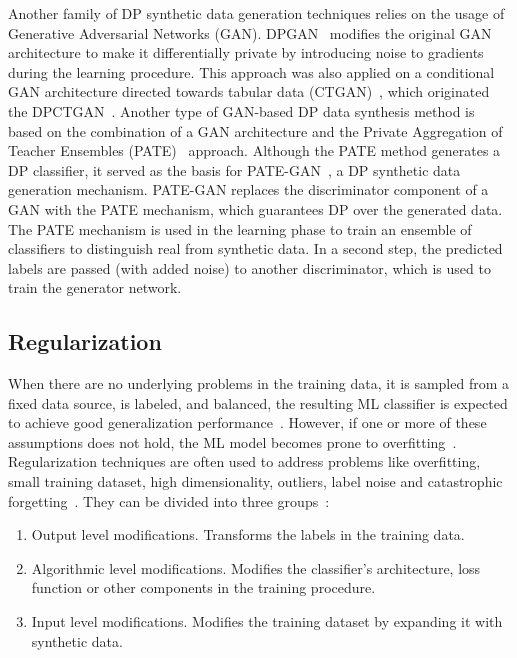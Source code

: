 \documentclass[parskip=full]{scrartcl}
\begin{document}
Another family of DP synthetic data generation techniques relies on the usage
of Generative Adversarial Networks (GAN). DPGAN~\cite{xie2018differentially}
modifies the original GAN architecture to make it differentially private by
introducing noise to gradients during the learning procedure. This approach
was also applied on a conditional GAN architecture directed towards tabular
data (CTGAN)~\cite{xu2019modeling}, which originated the
DPCTGAN~\cite{rosenblatt2020differentially}. Another type of GAN-based DP data
synthesis method is based on the combination of a GAN architecture and the
Private Aggregation of Teacher Ensembles (PATE)~\cite{papernot2017semi}
approach. Although the PATE method generates a DP classifier, it served as the
basis for PATE-GAN~\cite{jordon2018pate}, a DP synthetic data generation
mechanism. PATE-GAN replaces the discriminator component of a GAN with the
PATE mechanism, which guarantees DP over the generated data. The PATE
mechanism is used in the learning phase to train an ensemble of classifiers to
distinguish real from synthetic data. In a second step, the predicted labels
are passed (with added noise) to another discriminator, which is used to train
the generator network.

\subsection{Regularization}\label{sec:regularization}

When there are no underlying problems in the training data, it is sampled from
a fixed data source, is labeled, and balanced, the resulting ML classifier is
expected to achieve good generalization performance~\cite{benning2018modern}.
However, if one or more of these assumptions does not hold, the ML model
becomes prone to overfitting~\cite{Bartlett2021}. Regularization techniques
are often used to address problems like overfitting, small training dataset,
high dimensionality, outliers, label noise and catastrophic
forgetting~\cite{Halevy2009, Domingos2012, Salman2019, Xie2021}. They can be
divided into three groups~\cite{santos2022avoiding}:

\begin{enumerate}
    \item Output level modifications. Transforms the labels in the training
        data.
    \item Algorithmic level modifications. Modifies the classifier's
        architecture, loss function or other components in the training
        procedure.
    \item Input level modifications. Modifies the training dataset by
        expanding it with synthetic data.
\end{enumerate}
\end{document}
